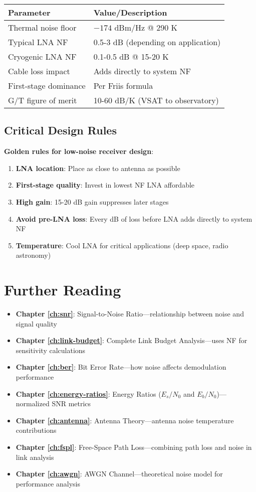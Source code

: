 \begin{center}
\begin{tabular}{@{}ll@{}}
\toprule
\textbf{Parameter} & \textbf{Value/Description} \\
\midrule
Thermal noise floor & $-174$ dBm/Hz @ 290 K \\
Typical LNA NF & 0.5-3 dB (depending on application) \\
Cryogenic LNA NF & 0.1-0.5 dB @ 15-20 K \\
Cable loss impact & Adds directly to system NF \\
First-stage dominance & Per Friis formula \\
G/T figure of merit & 10-60 dB/K (VSAT to observatory) \\
\bottomrule
\end{tabular}
\end{center}

\subsection{Critical Design Rules}

\textbf{Golden rules for low-noise receiver design}:
\begin{enumerate}
\item \textbf{LNA location}: Place as close to antenna as possible
\item \textbf{First-stage quality}: Invest in lowest NF LNA affordable
\item \textbf{High gain}: 15-20 dB gain suppresses later stages
\item \textbf{Avoid pre-LNA loss}: Every dB of loss before LNA adds directly to system NF
\item \textbf{Temperature}: Cool LNA for critical applications (deep space, radio astronomy)
\end{enumerate}

\section{Further Reading}

\begin{itemize}
\item \textbf{Chapter \ref{ch:snr}}: Signal-to-Noise Ratio---relationship between noise and signal quality
\item \textbf{Chapter \ref{ch:link-budget}}: Complete Link Budget Analysis---uses NF for sensitivity calculations
\item \textbf{Chapter \ref{ch:ber}}: Bit Error Rate---how noise affects demodulation performance
\item \textbf{Chapter \ref{ch:energy-ratios}}: Energy Ratios ($E_s/N_0$ and $E_b/N_0$)---normalized SNR metrics
\item \textbf{Chapter \ref{ch:antenna}}: Antenna Theory---antenna noise temperature contributions
\item \textbf{Chapter \ref{ch:fspl}}: Free-Space Path Loss---combining path loss and noise in link analysis
\item \textbf{Chapter \ref{ch:awgn}}: AWGN Channel---theoretical noise model for performance analysis
\end{itemize}
